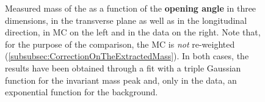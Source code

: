 \begin{figure}[!p]
\hspace*{-2.cm}
\hspace*{-2.cm}
\hspace*{-2.cm}
\caption{Measured mass of the \rmLambda as a function of the \textbf{opening angle} in three dimensions, in the transverse plane as well as in the longitudinal direction, in MC on the left and in the data on the right. Note that, for the purpose of the comparison, the MC is \textit{not} re-weighted (\Sec\ref{subsubsec:CorrectionOnTheExtractedMass}). In both cases, the results have been obtained through a fit with a triple Gaussian function for the invariant mass peak and, only in the data, an exponential function for the background.}
	\label{fig:MassVsOpeningAngleLambda}
\end{figure}

